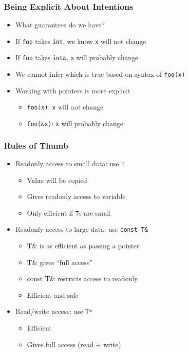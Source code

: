 \documentclass{../ucll-slides}
\begin{document}
\begin{frame}
  \frametitle{Being Explicit About Intentions}
  \begin{itemize}
    \item What guarantees do we have?
    \item If {\tt foo} takes {\tt int}, we know {\tt x} will not change
    \item If {\tt foo} takes {\tt int\&}, {\tt x} will probably change
    \item We cannot infer which is true based on syntax of {\tt foo(x)}
    \item Working with pointers is more explicit
          \begin{itemize}
            \item {\tt foo(x)}: {\tt x} will not change
            \item {\tt foo(\&x)}: {\tt x} will probably change
          \end{itemize}
  \end{itemize}
\end{frame}

\begin{frame}
  \frametitle{Rules of Thumb}
  \begin{itemize}
    \item Readonly access to small data: use {\tt T}
          \begin{itemize}
            \item Value will be copied
            \item Gives readonly access to variable
            \item Only efficient if {\tt T}s are small
          \end{itemize}
    \item Readonly access to large data: use {\tt const T\&}
          \begin{itemize}
            \item {T\&} is as efficient as passing a pointer
            \item {T\&} gives ``full access''
            \item {const T\&} restricts access to readonly
            \item Efficient and safe
          \end{itemize}
    \item Read/write access: use {\tt T*}
          \begin{itemize}
            \item Efficient
            \item Gives full access (read + write)
          \end{itemize}
  \end{itemize}  
\end{frame}
\end{document}
